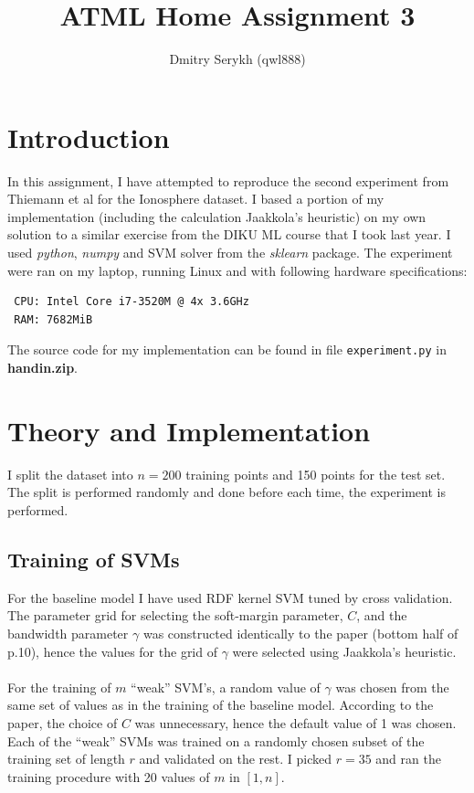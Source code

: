 \documentclass[a4paper]{article}
\title{\vspace{-5cm}ATML Home Assignment 3}
\author{Dmitry Serykh (qwl888)}
\begin{document}
\maketitle
\section{Introduction}
In this assignment, I have attempted to reproduce the second experiment from
Thiemann et al for the Ionosphere dataset. I based a portion of my implementation
(including the calculation Jaakkola's heuristic) on my own solution to a similar
exercise from the DIKU ML course that I took last year. I used \emph{python},
\emph{numpy} and SVM solver from the \emph{sklearn} package. The experiment were
ran on my laptop, running Linux and with following hardware specifications:
\begin{verbatim}
 CPU: Intel Core i7-3520M @ 4x 3.6GHz
 RAM: 7682MiB
\end{verbatim}
The source code for my
implementation can be found in file \texttt{experiment.py} in
\textbf{handin.zip}.

\section{Theory and Implementation}
I split the dataset into $n=200$ training points and 150 points for the test
set. The split is performed randomly and done before each time, the experiment is performed.

\subsection{Training of SVMs}
For the baseline model I have used RDF kernel SVM tuned by cross validation. The
parameter grid for selecting the soft-margin parameter, $C$, and the bandwidth
parameter $\gamma$ was constructed identically to the paper (bottom half of
p.10), hence the values for the grid of $\gamma$ were selected using Jaakkola's
heuristic. \\\\
For the training of $m$ ``weak'' SVM's, a random value of
$\gamma$ was chosen from the same set of values as in the training of the
baseline model. According to the paper, the choice of $C$ was unnecessary,
hence the default value of 1 was chosen.
Each of the ``weak'' SVMs was trained on a randomly chosen subset of the
training set of length $r$ and validated on the rest. I picked $r=35$ and ran
the training procedure with 20 values of $m$ in $[1, n]$.
\end{document}
